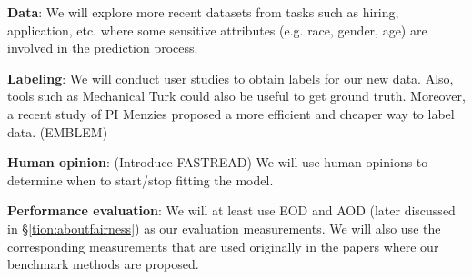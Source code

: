 \bi
\item  {\bf  Data}: We will explore more recent datasets from tasks such as hiring, application, etc. where some sensitive attributes (e.g. race, gender, age) are involved in the prediction process. 
\item {\bf  Labeling}: We will conduct user studies to obtain labels for our new data. Also, tools such as Mechanical Turk could also be useful to get ground truth. Moreover, a recent study of PI Menzies proposed a more efficient and cheaper way to label data. (EMBLEM)
\item  {\bf  Human opinion}: (Introduce FASTREAD) We will use human opinions to determine when to start/stop fitting the model.
\item {\bf  Performance evaluation}: We will at least use EOD and AOD (later discussed in \S\ref{tion:aboutfairness}) as our evaluation measurements. We will also use the corresponding measurements that are  used originally in the papers where our benchmark methods are proposed. 
\ei


